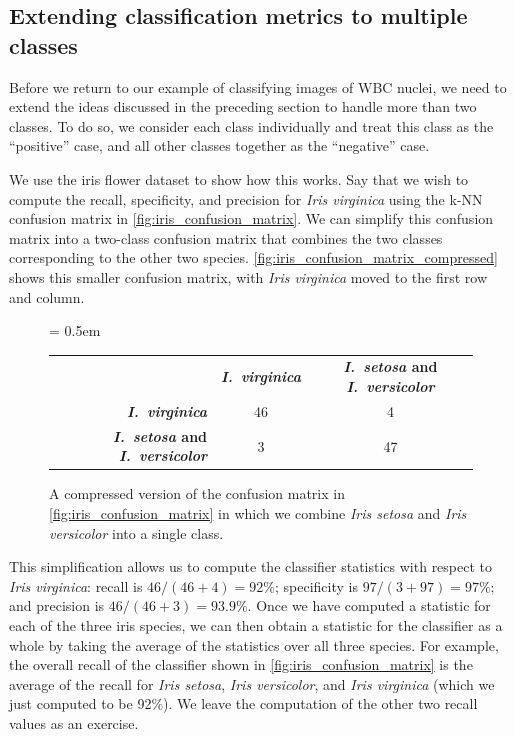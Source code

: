 \FloatBarrier
{}
\subsection{Extending classification metrics to multiple classes}

Before we return to our example of classifying images of WBC nuclei, we need to extend the ideas discussed in the preceding section to handle more than two classes. To do so, we consider each class individually and treat this class as the ``positive'' case, and all other classes together as the ``negative'' case.

We use the iris flower dataset to show how this works. Say that we wish to compute the recall, specificity, and precision for \textit{Iris virginica} using the k-NN confusion matrix in \autoref{fig:iris_confusion_matrix}. We can simplify this confusion matrix into a two-class confusion matrix that combines the two classes corresponding to the other two species. \autoref{fig:iris_confusion_matrix_compressed}
 shows this smaller confusion matrix, with \textit{Iris virginica} moved to the first row and column.\\

 \begin{figure}[h]
\centering
\tabcolsep = 0.5em
\mySfFamily
\begin{tabular}{r c c}
\rowcolor{gray!50}
& \textbf{\textit{I.~virginica}} & \textbf{\textit{I.~setosa} and \textit{I.~versicolor}} \\
\textbf{\textit{I.~virginica}} & 46 & \phantom{5}4 \\
\textbf{\textit{I.~setosa} and \textit{I.~versicolor}} & \phantom{5}3 & 47 \\
\end{tabular}
\caption{A compressed version of the confusion matrix in \autoref{fig:iris_confusion_matrix} in which we combine \textit{Iris setosa} and \textit{Iris versicolor} into a single class.}
\label{fig:iris_confusion_matrix_compressed}
\end{figure}

This simplification allows us to compute the classifier statistics with respect to \textit{Iris virginica}: recall is $46/(46+4) = 92\%$; specificity is $97/(3+97) = 97\%$; and precision is $46/(46+3) = 93.9\%$. Once we have computed a statistic for each of the three iris species, we can then obtain a statistic for the classifier as a whole by taking the average of the statistics over all three species. For example, the overall recall of the classifier shown in \autoref{fig:iris_confusion_matrix} is the average of the recall for \textit{Iris setosa}, \textit{Iris versicolor}, and \textit{Iris virginica} (which we just computed to be 92\%). We leave the computation of the other two recall values as an exercise.\\

